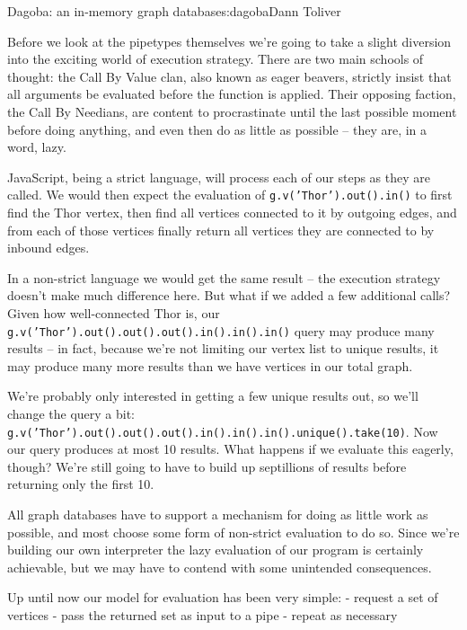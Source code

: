 \begin{aosachapter}{Dagoba: an in-memory graph database}{s:dagoba}{Dann Toliver}
\label{the-problem-with-being-eager}

Before we look at the pipetypes themselves we're going to take a slight
diversion into the exciting world of execution strategy. There are two
main schools of thought: the Call By Value clan, also known as eager
beavers, strictly insist that all arguments be evaluated before the
function is applied. Their opposing faction, the Call By Needians, are
content to procrastinate until the last possible moment before doing
anything, and even then do as little as possible -- they are, in a word,
lazy.

JavaScript, being a strict language, will process each of our steps as
they are called. We would then expect the evaluation of
\texttt{g.v('Thor').out().in()} to first find the Thor vertex, then find
all vertices connected to it by outgoing edges, and from each of those
vertices finally return all vertices they are connected to by inbound
edges.

In a non-strict language we would get the same result -- the execution
strategy doesn't make much difference here. But what if we added a few
additional calls? Given how well-connected Thor is, our
\texttt{g.v('Thor').out().out().out().in().in().in()} query may produce
many results -- in fact, because we're not limiting our vertex list to
unique results, it may produce many more results than we have vertices
in our total graph.

We're probably only interested in getting a few unique results out, so
we'll change the query a bit:
\texttt{g.v('Thor').out().out().out().in().in().in().unique().take(10)}.
Now our query produces at most 10 results. What happens if we evaluate
this eagerly, though? We're still going to have to build up septillions
of results before returning only the first 10.

All graph databases have to support a mechanism for doing as little work
as possible, and most choose some form of non-strict evaluation to do
so. Since we're building our own interpreter the lazy evaluation of our
program is certainly achievable, but we may have to contend with some
unintended consequences.

\label{ramifications-of-evaluation-strategy-on-our-mental-model}

Up until now our model for evaluation has been very simple: - request a
set of vertices - pass the returned set as input to a pipe - repeat as
necessary


\end{aosachapter}
